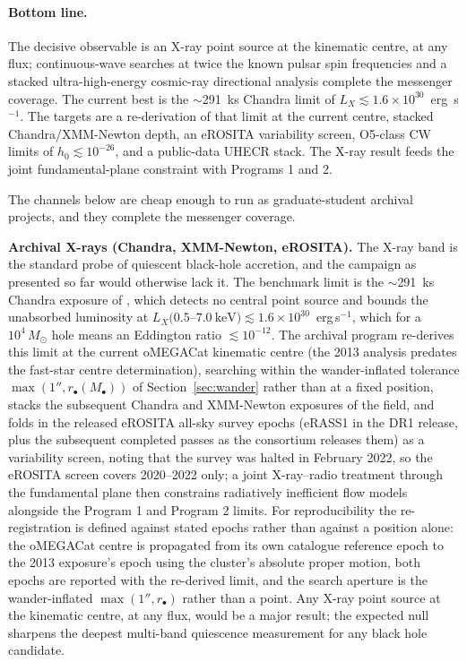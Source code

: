 \documentclass[11pt]{article}
\newcommand{\msun}{\ensuremath{M_\odot}}
\begin{document}
\paragraph{Bottom line.} The decisive observable is an X-ray point source at the kinematic centre, at any flux; continuous-wave searches at twice the known pulsar spin frequencies and a stacked ultra-high-energy cosmic-ray directional analysis complete the messenger coverage. The current best is the $\sim$291~ks Chandra limit of $L_{X} \lesssim 1.6\times10^{30}$~erg~s$^{-1}$. The targets are a re-derivation of that limit at the current centre, stacked Chandra/XMM-Newton depth, an eROSITA variability screen, O5-class CW limits of $h_{0} \lesssim 10^{-26}$, and a public-data UHECR stack. The X-ray result feeds the joint fundamental-plane constraint with Programs 1 and 2.

The channels below are cheap enough to run as graduate-student archival projects, and they complete the messenger coverage.

\textbf{Archival X-rays (Chandra, XMM-Newton, eROSITA).} The X-ray band is the standard probe of quiescent black-hole accretion, and the campaign as presented so far would otherwise lack it. The benchmark limit is the $\sim$291~ks Chandra exposure of \citet{Haggard2013}, which detects no central point source and bounds the unabsorbed luminosity at $L_X(0.5$--$7.0~\mathrm{keV}) \lesssim 1.6\times10^{30}$~erg\,s$^{-1}$, which for a $10^{4}\,\msun$ hole means an Eddington ratio $\lesssim 10^{-12}$. The archival program re-derives this limit at the current oMEGACat kinematic centre (the 2013 analysis predates the fast-star centre determination), searching within the wander-inflated tolerance $\max(1'', r_{\bullet}(M_{\bullet}))$ of Section~\ref{sec:wander} rather than at a fixed position, stacks the subsequent Chandra and XMM-Newton exposures of the field, and folds in the released eROSITA all-sky survey epochs (eRASS1 in the DR1 release, plus the subsequent completed passes as the consortium releases them) as a variability screen, noting that the survey was halted in February 2022, so the eROSITA screen covers 2020--2022 only; a joint X-ray--radio treatment through the fundamental plane \citep{Merloni2003} then constrains radiatively inefficient flow models alongside the Program 1 and Program 2 limits. For reproducibility the re-registration is defined against stated epochs rather than against a position alone: the oMEGACat centre is propagated from its own catalogue reference epoch to the 2013 exposure's epoch using the cluster's absolute proper motion, both epochs are reported with the re-derived limit, and the search aperture is the wander-inflated $\max(1'', r_{\bullet})$ rather than a point. Any X-ray point source at the kinematic centre, at any flux, would be a major result; the expected null sharpens the deepest multi-band quiescence measurement for any black hole candidate.
\end{document}

